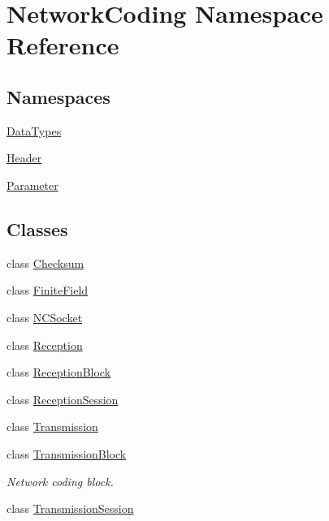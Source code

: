 \hypertarget{namespace_network_coding}{}\section{Network\+Coding Namespace Reference}
\label{namespace_network_coding}
\subsection*{Namespaces}
\begin{DoxyCompactItemize}
\item 
 \hyperlink{namespace_network_coding_1_1_data_types}{Data\+Types}
\item 
 \hyperlink{namespace_network_coding_1_1_header}{Header}
\item 
 \hyperlink{namespace_network_coding_1_1_parameter}{Parameter}
\end{DoxyCompactItemize}
\subsection*{Classes}
\begin{DoxyCompactItemize}
\item 
class \hyperlink{class_network_coding_1_1_checksum}{Checksum}
\item 
class \hyperlink{class_network_coding_1_1_finite_field}{Finite\+Field}
\item 
class \hyperlink{class_network_coding_1_1_n_c_socket}{N\+C\+Socket}
\item 
class \hyperlink{class_network_coding_1_1_reception}{Reception}
\item 
class \hyperlink{class_network_coding_1_1_reception_block}{Reception\+Block}
\item 
class \hyperlink{class_network_coding_1_1_reception_session}{Reception\+Session}
\item 
class \hyperlink{class_network_coding_1_1_transmission}{Transmission}
\item 
class \hyperlink{class_network_coding_1_1_transmission_block}{Transmission\+Block}
\begin{DoxyCompactList}\small\item\em Network coding block. \end{DoxyCompactList}\item 
class \hyperlink{class_network_coding_1_1_transmission_session}{Transmission\+Session}
\end{DoxyCompactItemize}
